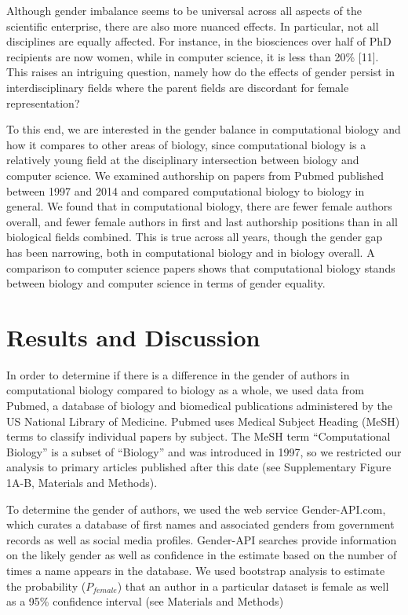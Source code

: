 \documentclass[11pt]{article}
\begin{document}
Although gender imbalance seems to be universal across all aspects of the scientific enterprise, there are also more nuanced effects. In particular, not all disciplines are equally affected. For instance, in the biosciences over half of PhD recipients are now women, while in computer science, it is less than 20\% [11]. This raises an intriguing question, namely how do the effects of gender persist in interdisciplinary fields where the parent fields are discordant for female representation?

To this end, we are interested in the gender balance in computational biology and how it compares to other areas of biology, since computational biology is a relatively young field at the disciplinary intersection between biology and computer science. We examined authorship on papers from Pubmed published between 1997 and 2014 and compared computational biology to biology in general. We found that in computational biology, there are fewer female authors overall, and fewer female authors in first and last authorship positions than in all biological fields combined. This is true across all years, though the gender gap has been narrowing, both in computational biology and in biology overall. A comparison to computer science papers shows that computational biology stands between biology and computer science in terms of gender equality.

\section{Results and Discussion}
In order to determine if there is a difference in the gender of authors in computational biology compared to biology as a whole, we used data from Pubmed, a database of biology and biomedical publications administered by the US National Library of Medicine. Pubmed uses Medical Subject Heading (MeSH) terms to classify individual papers by subject. The MeSH term “Computational Biology” is a subset of “Biology” and was introduced in 1997, so we restricted our analysis to primary articles published after this date (see Supplementary Figure 1A-B, Materials and Methods).

To determine the gender of authors, we used the web service Gender-API.com, which curates a database of first names and associated genders from government records as well as social media profiles. Gender-API searches provide information on the likely gender as well as confidence in the estimate based on the number of times a name appears in the database. We used bootstrap analysis to estimate the probability ($P_{female}$) that an author in a particular dataset is female as well as a 95\% confidence interval (see Materials and Methods)
\end{document}
